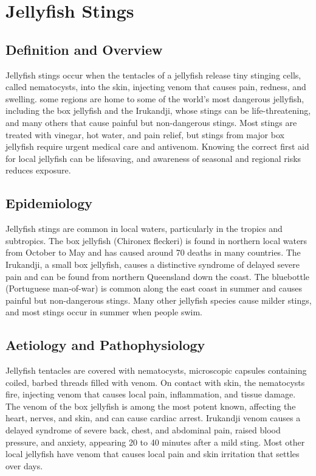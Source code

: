 \chapter{Jellyfish Stings}

\section*{Definition and Overview}
Jellyfish stings occur when the tentacles of a jellyfish release tiny stinging cells, called nematocysts, into the skin, injecting venom that causes pain, redness, and swelling. some regions are home to some of the world's most dangerous jellyfish, including the box jellyfish and the Irukandji, whose stings can be life-threatening, and many others that cause painful but non-dangerous stings. Most stings are treated with vinegar, hot water, and pain relief, but stings from major box jellyfish require urgent medical care and antivenom. Knowing the correct first aid for local jellyfish can be lifesaving, and awareness of seasonal and regional risks reduces exposure.

\section*{Epidemiology}
Jellyfish stings are common in local waters, particularly in the tropics and subtropics. The box jellyfish (Chironex fleckeri) is found in northern local waters from October to May and has caused around 70 deaths in many countries. The Irukandji, a small box jellyfish, causes a distinctive syndrome of delayed severe pain and can be found from northern Queensland down the coast. The bluebottle (Portuguese man-of-war) is common along the east coast in summer and causes painful but non-dangerous stings. Many other jellyfish species cause milder stings, and most stings occur in summer when people swim.

\section*{Aetiology and Pathophysiology}
Jellyfish tentacles are covered with nematocysts, microscopic capsules containing coiled, barbed threads filled with venom. On contact with skin, the nematocysts fire, injecting venom that causes local pain, inflammation, and tissue damage. The venom of the box jellyfish is among the most potent known, affecting the heart, nerves, and skin, and can cause cardiac arrest. Irukandji venom causes a delayed syndrome of severe back, chest, and abdominal pain, raised blood pressure, and anxiety, appearing 20 to 40 minutes after a mild sting. Most other local jellyfish have venom that causes local pain and skin irritation that settles over days.

